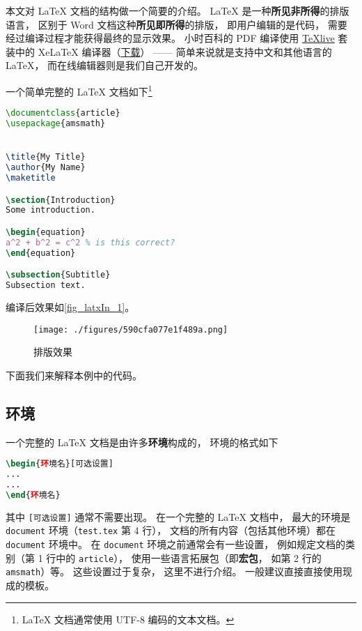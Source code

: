 
本文对 LaTeX 文档的结构做一个简要的介绍。 LaTeX 是一种\textbf{所见非所得}的排版语言， 区别于 Word 文档这种\textbf{所见即所得}的排版， 即用户编辑的是代码， 需要经过编译过程才能获得最终的显示效果。 小时百科的 PDF 编译使用 \href{https://www.tug.org/texlive/}{TeXlive} 套装中的 XeLaTeX 编译器（\href{https://www.tug.org/texlive/acquire-iso.html}{下载}）%
—— 简单来说就是支持中文和其他语言的 LaTeX， 而在线编辑器则是我们自己开发的。

一个简单完整的 LaTeX 文档如下\footnote{LaTeX 文档通常使用 UTF-8 编码的文本文档。}

\begin{lstlisting}[language=latex, caption=test.tex]
\documentclass{article}
\usepackage{amsmath}


\title{My Title}
\author{My Name}
\maketitle

\section{Introduction}
Some introduction.

\begin{equation}
a^2 + b^2 = c^2 % is this correct?
\end{equation}

\subsection{Subtitle}
Subsection text.


\end{lstlisting}

编译后效果如\autoref{fig_latxIn_1}。
\begin{figure}[ht]
\centering
\texttt{[image: ./figures/590cfa077e1f489a.png]}
\caption{排版效果} \label{fig_latxIn_1}
\end{figure}
下面我们来解释本例中的代码。

\subsection{环境}
一个完整的 LaTeX 文档是由许多\textbf{环境}构成的， 环境的格式如下
\begin{lstlisting}[language=latex]
\begin{环境名}[可选设置]
...
...
\end{环境名}
\end{lstlisting}
其中 \verb|[可选设置]| 通常不需要出现。 在一个完整的 LaTeX 文档中， 最大的环境是 \verb|document| 环境（\verb|test.tex| 第 4 行）， 文档的所有内容（包括其他环境）都在 \verb|document| 环境中。 在 \verb|document| 环境之前通常会有一些设置， 例如规定文档的类别（第 1 行中的 \verb|article|）， 使用一些语言拓展包（即\textbf{宏包}， 如第 2 行的 \verb|amsmath|）等。 这些设置过于复杂， 这里不进行介绍。 一般建议直接直接使用现成的模板。

